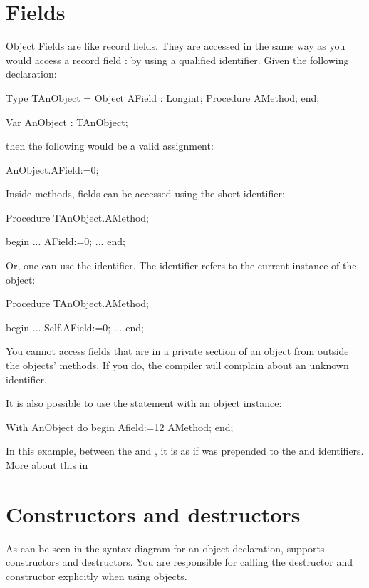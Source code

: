 \documentclass{report}
\begin{document}
\section{Fields}

Object Fields are like record fields. They are accessed in the same way as
you would access a record field : by using a qualified identifier. Given the
following declaration:
\begin{listing}
Type TAnObject = Object
       AField : Longint;
       Procedure AMethod;
       end;

Var AnObject : TAnObject;
\end{listing}
then the following would be a valid assignment:
\begin{listing}
  AnObject.AField:=0;
\end{listing}

Inside methods, fields can be accessed using the short identifier:
\begin{listing}
Procedure TAnObject.AMethod;

begin
  ...
  AField:=0;
  ...
end;
\end{listing}
Or, one can use the  identifier. The  identifier refers
to the current instance of the object:
\begin{listing}
Procedure TAnObject.AMethod;

begin
  ...
  Self.AField:=0;
  ...
end;
\end{listing}

You cannot access fields that are in a private section of an object from
outside the objects' methods. If you do, the compiler will complain about
an unknown identifier.

It is also possible to use the  statement with an object instance:
\begin{listing}
With AnObject do
  begin
  Afield:=12
  AMethod;
  end;
\end{listing}
In this example, between the  and , it is as if
 was prepended to the  and 
identifiers. More about this in 

\section{Constructors and destructors }
\label{se:constructdestruct}

As can be seen in the syntax diagram for an object declaration, \fpc supports
constructors and destructors. You are responsible for calling the 
destructor and constructor explicitly when using objects.
\end{document}
